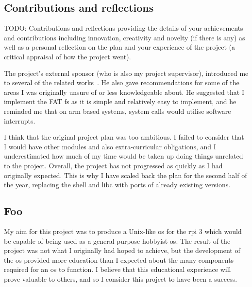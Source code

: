 \documentclass{article}
\begin{document}
\subsection{Contributions and reflections}
TODO: Contributions and reflections providing the details of your achievements
and contributions including innovation, creativity and novelty (if there is
any) as well as a personal reflection on the plan and your experience of the
project (a critical appraisal of how the project went).

The project's external sponsor (who is also my project supervisor), introduced
me to several of the related works~\cite{netBSD-git, riscOS-source}. He also
gave recommendations for some of the areas I was originally unsure of or less
knowledgeable about. He suggested that I implement the FAT \gls{fs} as it is
simple and relatively easy to implement, and he reminded me that on \gls{arm}
based systems, system calls would utilise software interrupts.

I think that the original project plan was too ambitious. I failed to consider
that I would have other modules and also extra-curricular obligations, and I
underestimated how much of my time would be taken up doing things unrelated to
the project. Overall, the project has not progressed as quickly as I had
originally expected. This is why I have scaled back the plan for the second
half of the year, replacing the shell and libc with ports of already existing
versions.

\subsection{Foo}
My aim for this project was to produce a Unix-like \gls{os} for the \gls{rpi} 3
which would be capable of being used as a general purpose hobbyist \gls{os}.
The result of the project was not what I originally had hoped to achieve, but
the development of the \gls{os} provided more education than I expected about
the many components required for an \gls{os} to function. I believe that this
educational experience will prove valuable to others, and so I consider this
project to have been a success.
\end{document}

